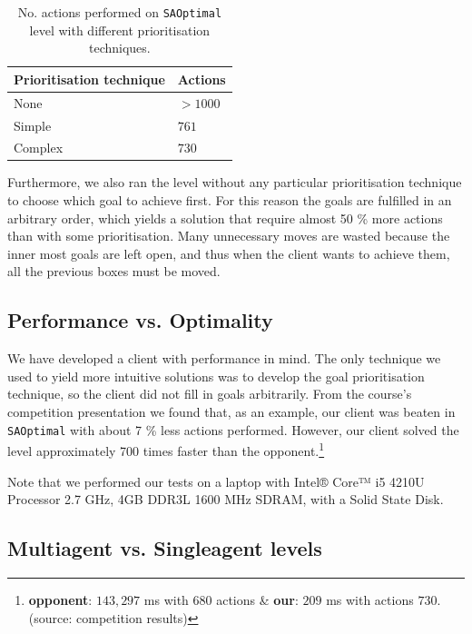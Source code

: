 \begin{table}[h!]
  \centering
  \begin{tabular}{@{}ll@{}}
    \toprule
    Prioritisation technique & Actions \\
    \midrule
    None    & $>1000$ \\
    Simple  & $761$ \\
    Complex & $730$ \\
    \bottomrule
  \end{tabular}
  \caption{\label{tab:SAOptimal_results}No. actions performed on \texttt{SAOptimal} level with different prioritisation techniques.}
\end{table}

Furthermore, we also ran the level without any particular prioritisation technique to choose which goal to achieve first.
For this reason the goals are fulfilled in an arbitrary order, which yields a solution that require almost 50 \% more actions than with some prioritisation.
Many unnecessary moves are wasted because the inner most goals are left open, and thus when the client wants to achieve them, all the previous boxes must be moved.

\subsection{Performance vs. Optimality}
\label{sec:performance vs. optimality}

We have developed a client with performance in mind.
The only technique we used to yield more intuitive solutions was to develop the goal prioritisation technique, so the client did not fill in goals arbitrarily.
From the course's competition presentation we found that, as an example, our client was beaten in \texttt{SAOptimal} with about 7 \% less actions performed.
However, our client solved the level approximately 700 times faster than the opponent.\footnote{\textbf{opponent}: $143,297$ ms with $680$ actions \& \textbf{our}: $209$ ms with actions $730$. (source: competition results)}

Note that we performed our tests on a laptop with Intel® Core™ i5 4210U Processor 2.7 GHz, 4GB DDR3L 1600 MHz SDRAM, with a Solid State Disk.

\subsection{Multiagent vs. Singleagent levels}


